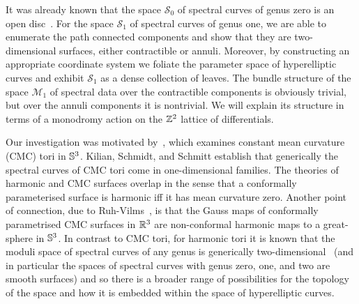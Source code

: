 \documentclass{article}
\begin{document}
It was already known that the space $\mathcal{S}_0$ of spectral curves of genus zero is an open disc~\cite[Section 9]{Hitchin1990}.
For the space $\mathcal{S}_1$ of spectral curves of genus one, we are able to enumerate the path connected components and show that they are two-dimensional surfaces, either contractible or annuli. Moreover, by constructing an appropriate coordinate system we foliate the parameter space of hyperelliptic curves and exhibit $\mathcal{S}_1$ as a dense collection of leaves.
The bundle structure of the space $\mathcal{M}_1$ of spectral data over the contractible components is obviously trivial, but over the annuli components it is nontrivial. We will explain its structure in terms of a monodromy action on the $\Z^2$ lattice of differentials.

Our investigation was motivated by~\cite{Kilian2015}, which examines constant mean curvature (CMC) tori in $\S^3$. 
Kilian, Schmidt, and Schmitt establish that generically the spectral curves of CMC tori come in one-dimensional families. The theories of harmonic and CMC surfaces overlap in the sense that a conformally parameterised surface is harmonic iff it has mean curvature zero.
Another point of connection, due to Ruh-Vilms~\cite{Ruh1970}, is that the Gauss maps of conformally parametrised CMC surfaces in $\R^3$ are non-conformal harmonic maps to a great-sphere in $\S^3$.
In contrast to CMC tori, for harmonic tori it is known that the moduli space of spectral curves of any genus is generically two-dimensional~\cite{Carberry2019} (and in particular the spaces of spectral curves with genus zero, one, and two are smooth surfaces) and so there is a broader range of possibilities for the topology of the space and how it is embedded within the space of hyperelliptic curves.
\end{document}
